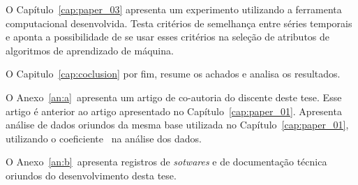 O Capítulo~\ref{cap:paper_03} apresenta um experimento utilizando a ferramenta computacional desenvolvida. Testa critérios de semelhança entre séries temporais e aponta a possibilidade de se usar esses critérios na seleção de atributos de algoritmos de aprendizado de máquina.

O Capitulo~\ref{cap:coclusion} por fim, resume os achados e analisa os resultados.

O Anexo~\ref{an:a}~apresenta um artigo de co-autoria do discente deste tese. Esse artigo é anterior ao artigo apresentado no Capítulo~\ref{cap:paper_01}. Apresenta análise de dados oriundos da mesma base utilizada no Capítulo~\ref{cap:paper_01}, utilizando o coeficiente \pdcca~na análise dos dados.

O Anexo~\ref{an:b}~apresenta registros de \emph{sotwares} e de documentação técnica oriundos do desenvolvimento desta tese.